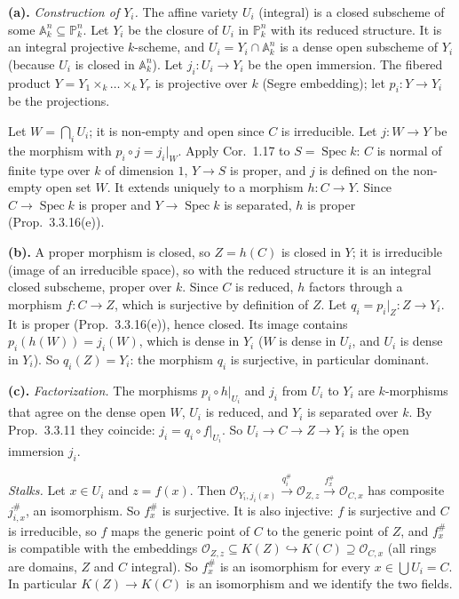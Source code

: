 \documentclass[11pt]{article}
\begin{document}
\textbf{(a).} \emph{Construction of $Y_i$.} The affine variety $U_i$ (integral) is a closed subscheme of some $\mathbb A^{n}_k\subseteq\mathbb P^n_k$. Let $Y_i$ be the closure of $U_i$ in $\mathbb P^n_k$ with its reduced structure. It is an integral projective $k$-scheme, and $U_i=Y_i\cap\mathbb A^n_k$ is a dense open subscheme of $Y_i$ (because $U_i$ is closed in $\mathbb A^n_k$). Let $j_i:U_i\to Y_i$ be the open immersion. The fibered product $Y=Y_1\times_k\dots\times_kY_r$ is projective over $k$ (Segre embedding); let $p_i:Y\to Y_i$ be the projections.

Let $W=\bigcap_iU_i$; it is non-empty and open since $C$ is irreducible. Let $j:W\to Y$ be the morphism with $p_i\circ j=j_i|_W$. Apply Cor.~1.17 to $S=\operatorname{Spec}k$: $C$ is normal of finite type over $k$ of dimension $1$, $Y\to S$ is proper, and $j$ is defined on the non-empty open set $W$. It extends uniquely to a morphism $h:C\to Y$. Since $C\to\operatorname{Spec}k$ is proper and $Y\to\operatorname{Spec}k$ is separated, $h$ is proper (Prop.~3.3.16(e)).

\textbf{(b).} A proper morphism is closed, so $Z=h(C)$ is closed in $Y$; it is irreducible (image of an irreducible space), so with the reduced structure it is an integral closed subscheme, proper over $k$. Since $C$ is reduced, $h$ factors through a morphism $f:C\to Z$, which is surjective by definition of $Z$. Let $q_i=p_i|_Z:Z\to Y_i$. It is proper (Prop.~3.3.16(e)), hence closed. Its image contains $p_i(h(W))=j_i(W)$, which is dense in $Y_i$ ($W$ is dense in $U_i$, and $U_i$ is dense in $Y_i$). So $q_i(Z)=Y_i$: the morphism $q_i$ is surjective, in particular dominant.

\textbf{(c).} \emph{Factorization.} The morphisms $p_i\circ h|_{U_i}$ and $j_i$ from $U_i$ to $Y_i$ are $k$-morphisms that agree on the dense open $W$, $U_i$ is reduced, and $Y_i$ is separated over $k$. By Prop.~3.3.11 they coincide: $j_i=q_i\circ f|_{U_i}$. So $U_i\to C\to Z\to Y_i$ is the open immersion $j_i$.

\emph{Stalks.} Let $x\in U_i$ and $z=f(x)$. Then $\mathcal O_{Y_i,j_i(x)}\xrightarrow{q_i^\#}\mathcal O_{Z,z}\xrightarrow{f^\#_x}\mathcal O_{C,x}$ has composite $j^\#_{i,x}$, an isomorphism. So $f^\#_x$ is surjective. It is also injective: $f$ is surjective and $C$ is irreducible, so $f$ maps the generic point of $C$ to the generic point of $Z$, and $f^\#_x$ is compatible with the embeddings $\mathcal O_{Z,z}\subseteq K(Z)\hookrightarrow K(C)\supseteq\mathcal O_{C,x}$ (all rings are domains, $Z$ and $C$ integral). So $f^\#_x$ is an isomorphism for every $x\in\bigcup U_i=C$. In particular $K(Z)\to K(C)$ is an isomorphism and we identify the two fields.
\end{document}
